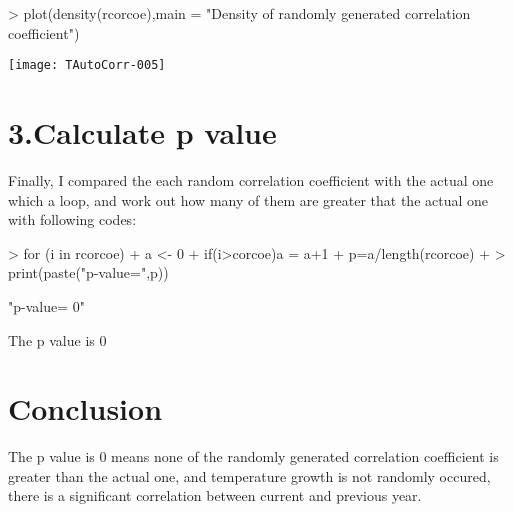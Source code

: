 \documentclass[12pt]{article}
\begin{document}
\begin{Schunk}
\begin{Sinput}
> plot(density(rcorcoe),main = "Density of randomly generated correlation coefficient")
\end{Sinput}
\end{Schunk}
\texttt{[image: TAutoCorr-005]}
\section*{3.Calculate p value}
  Finally, I compared the each random correlation coefficient with the actual one which a loop, and work out how many of them are greater that the actual one with following codes:
\begin{Schunk}
\begin{Sinput}
> for (i in rcorcoe){
+   a <- 0
+   if(i>corcoe){a = a+1}
+   p=a/length(rcorcoe)
+ }
> print(paste("p-value=",p))
\end{Sinput}
\begin{Soutput}
[1] "p-value= 0"
\end{Soutput}
\end{Schunk}
The p value is 0
\section*{Conclusion}
The p value is 0 means none of the randomly generated correlation coefficient is greater than the actual one, and temperature growth is not randomly occured, there is a significant correlation between current and previous year.
\end{document}
